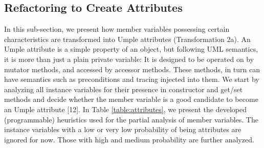 \subsection{Refactoring to Create Attributes}
In this sub-section, we present how member variables possessing certain characteristics are transformed into Umple attributes (Transformation 2a).
 An Umple attribute is a simple property of an object, but following UML semantics, it is more than just a plain private variable: It is designed to be operated on by mutator methods, and accessed by accessor methods. These methods, in turn can have semantics such as preconditions and tracing injected into them. 
We start by analyzing all instance variables for their presence in constructor and get/set methods and decide whether the member variable is a good candidate to become an Umple attribute [12].  In Table \ref{table:attributes}, we present the developed (programmable) heuristics used for the partial analysis of member variables. The instance variables with a low or very low probability of being attributes are ignored for now. Those with high and medium probability are further analyzed. 

